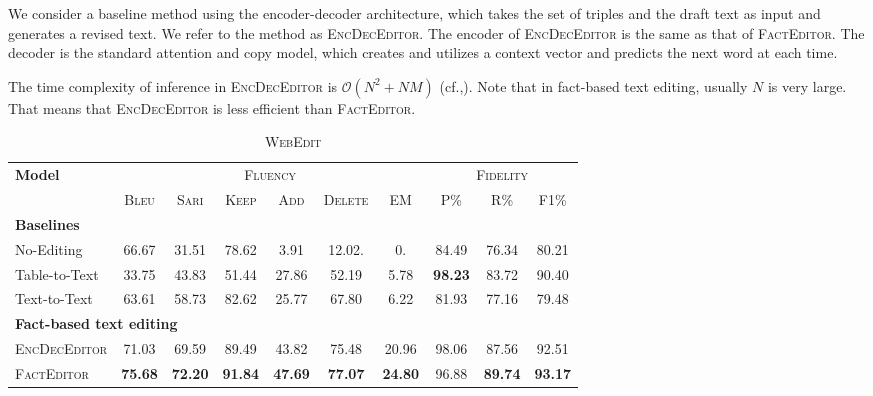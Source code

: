 \documentclass[11pt,a4paper]{article}
\begin{document}
We consider a baseline method using the encoder-decoder architecture, which takes the set of triples and the draft text as input and generates a revised text. We refer to the method as \textsc{EncDecEditor}. The encoder of \textsc{EncDecEditor} is the same as that of \textsc{FactEditor}.  The decoder is the standard attention and copy model, which creates and utilizes a context vector and predicts the next word at each time.

The time complexity of inference in \textsc{EncDecEditor} is $\mathcal{O}(N^2 + NM)$ (cf.,\citet{britz2017efficient}). Note that in fact-based text editing, usually $N$ is very large. That means that \textsc{EncDecEditor} is less efficient than \textsc{FactEditor}.

\begin{table*}[t]
    \begin{subtable}[t]{\textwidth}
        \centering
        \small
        \begin{tabular}{l|c|cccc|c|ccc}
            \toprule
            \multirow{2}{*}{\textbf{Model}} &  \multicolumn{6}{c|}{\textsc{Fluency}} &  \multicolumn{3}{c}{\textsc{Fidelity}} \\
            &\textsc{Bleu} & \textsc{Sari} & \textsc{Keep} & \textsc{Add} & \textsc{Delete} & \textsc{EM} & P\% & R\% & F1\%\\
            \midrule
            \multicolumn{10}{l}{\textbf{Baselines}}\\
            No-Editing              & 66.67 & 31.51 & 78.62 & 3.91 & 12.02. & 0. & 84.49 & 76.34 & 80.21\\
            Table-to-Text       & 33.75 & 43.83 & 51.44 & 27.86 & 52.19 & 5.78 & \textbf{98.23} & 83.72 & 90.40\\
            Text-to-Text       & 63.61 & 58.73 & 82.62 & 25.77 & 67.80 & 6.22 & 81.93 & 77.16 & 79.48\\
            \midrule
            \multicolumn{10}{l}{\textbf{Fact-based text editing}}\\
            \textsc{EncDecEditor} & 71.03 & 69.59 & 89.49 & 43.82 & 75.48 & 20.96 & 98.06 & 87.56 & 92.51\\
            \textsc{FactEditor} & \textbf{75.68} & \textbf{72.20} & \textbf{91.84} & \textbf{47.69} & \textbf{77.07} & \textbf{24.80} & 96.88 & \textbf{89.74} & \textbf{93.17}\\
            \bottomrule
        \end{tabular}
        \caption{\textsc{WebEdit}}
        \label{tab:Experiment_webedit}
    \end{subtable}

\end{table*}
\end{document}
